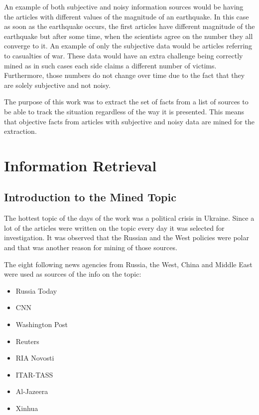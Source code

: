 \documentclass[]{article}
\begin{document}
An example of both subjective and noisy information sources would be having the articles with different values of the magnitude of an earthquake. In this case as soon as the earthquake occurs, the first articles have different magnitude of the earthquake but after some time, when the scientists agree on the number they all converge to it. An example of only the subjective data would be articles referring to casualties of war. These data would have an extra challenge being correctly mined as in such cases each side claims a different number of victims. Furthermore, those numbers do not change over time due to the fact that they are solely subjective and not noisy.

The purpose of this work was to extract the set of facts from a list of sources to be able to track the situation regardless of the way it is presented. This means that objective facts from articles with subjective and noisy data are mined for the extraction.
%
\section{Information Retrieval}
%
%
\subsection{Introduction to the Mined Topic}
%
The hottest topic of the days of the work was a political crisis in Ukraine. Since a lot of the articles were written on the topic every day it was selected for investigation. It was observed that the Russian and the West policies were polar and that was another reason for mining of those sources.

The eight following news agencies from Russia, the West, China and Middle East were used as sources of the info on the topic:
\begin{multicols}{2}
	\begin{itemize}
		\itemsep 0em
		\item Russia Today 
		\item CNN
		\item Washington Post
		\item Reuters
		\item RIA Novosti
		\item ITAR-TASS
		\item Al-Jazeera
		\item Xinhua
	\end{itemize}
\end{multicols}
%
\end{document}

